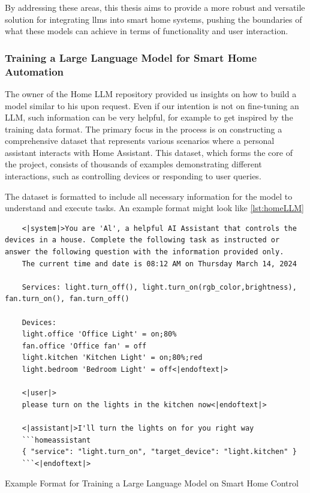 By addressing these areas, this thesis aims to provide a more robust and versatile solution for integrating \glspl{llm} into smart home systems, pushing the boundaries of what these models can achieve in terms of functionality and user interaction.

\subsubsection{Training a Large Language Model for Smart Home Automation}
The owner of the Home LLM repository provided us insights on how to build a model similar to his upon request.
Even if our intention is not on fine-tuning an LLM, such information can be very helpful, for example to get inspired by the training data format. 
The primary focus in the process is on constructing a comprehensive dataset that represents various scenarios where a personal assistant interacts with Home Assistant. This dataset, which forms the core of the project, consists of thousands of examples demonstrating different interactions, such as controlling devices or responding to user queries.

The dataset is formatted to include all necessary information for the model to understand and execute tasks. An example format might look like \cref{lst:homeLLM}

\begin{Listing}[h]
  \begin{lstlisting}
    <|system|>You are 'Al', a helpful AI Assistant that controls the devices in a house. Complete the following task as instructed or answer the following question with the information provided only.
    The current time and date is 08:12 AM on Thursday March 14, 2024
    
    Services: light.turn_off(), light.turn_on(rgb_color,brightness), fan.turn_on(), fan.turn_off()
    
    Devices:
    light.office 'Office Light' = on;80%
    fan.office 'Office fan' = off
    light.kitchen 'Kitchen Light' = on;80%;red
    light.bedroom 'Bedroom Light' = off<|endoftext|>
    
    <|user|>
    please turn on the lights in the kitchen now<|endoftext|>

    <|assistant|>I'll turn the lights on for you right way
    ```homeassistant
    { "service": "light.turn_on", "target_device": "light.kitchen" }
    ```<|endoftext|>
  \end{lstlisting}
  \caption{Example Format for Training a Large Language Model on Smart Home Control}
  \label{lst:homeLLM}
\end{Listing}

